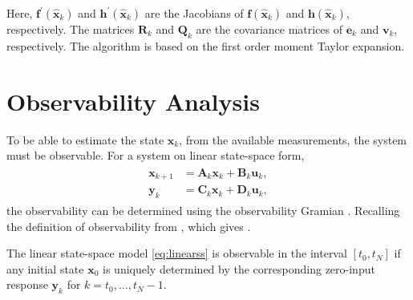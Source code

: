 Here, $\bm{f}^\prime(\hat{\bm{x}}_k)$ and $\bm{h}^\prime(\hat{\bm{x}}_k)$ are the Jacobians of $\bm{f}(\hat{\bm{x}}_k)$ and $\bm{h}(\hat{\bm{x}}_k)$, respectively.
The matrices $\bm{R}_k$ and $\bm{Q}_k$ are the covariance matrices of $\bm{e}_k$ and $\bm{v}_k$, respectively.
The algorithm is based on the first order moment Taylor expansion.

\section{Observability Analysis}
\label{sec:obsanalysis}
To be able to estimate the state $\bm{x}_k$, from the available measurements, the system must be observable.
For a system on linear state-space form,
\begin{align}
\label{eq:linearss}
\begin{split}
	\bm{x}_{k+1} &= \bm{A}_k \bm{x}_k + \bm{B}_k \bm{u}_k, \\
	\bm{y}_k &= \bm{C}_k \bm{x}_k + \bm{D}_k \bm{u}_k,
\end{split}
\end{align}
the observability can be determined using the observability Gramian \cite{Rugh:1996}.
Recalling the definition of observability from \cite{Rugh:1996}, which gives .

\begin{definition}[Observability] \label{def:observability}
	The linear state-space model \eqref{eq:linearss} is observable in the interval $[t_0, t_N]$ if any initial state $\bm{x}_0$ is uniquely determined by the corresponding zero-input response $\bm{y}_k$ for $k=t_0,\dots,t_N-1$.
\end{definition}

